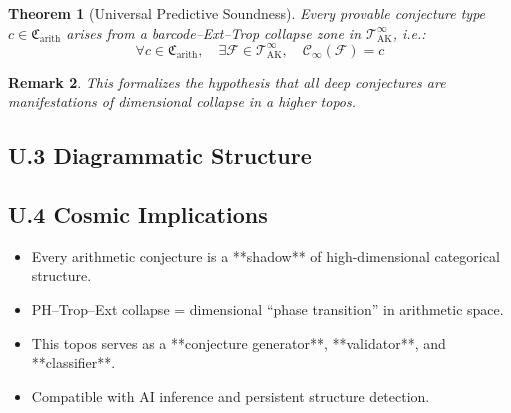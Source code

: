\documentclass[11pt]{article}
\newtheorem{theorem}{Theorem}[section]
\newtheorem{remark}[theorem]{Remark}
\begin{document}
\begin{theorem}[Universal Predictive Soundness]
Every provable conjecture type \( c \in \mathfrak{C}_{\mathrm{arith}} \) arises from a barcode–Ext–Trop collapse zone in \( \mathscr{T}_{\mathrm{AK}}^{\infty} \),  
i.e.:
\[
\forall c \in \mathfrak{C}_{\mathrm{arith}}, \quad \exists \mathcal{F} \in \mathscr{T}_{\mathrm{AK}}^{\infty}, \quad
\mathscr{C}_\infty(\mathcal{F}) = c
\]
\end{theorem}

\begin{remark}
This formalizes the hypothesis that all deep conjectures are manifestations of dimensional collapse in a higher topos.
\end{remark}

\subsection*{U.3 Diagrammatic Structure}

\vspace{1em}
\begin{center}
\end{center}
\vspace{1em}

\subsection*{U.4 Cosmic Implications}

\begin{itemize}
  \item Every arithmetic conjecture is a **shadow** of high-dimensional categorical structure.
  \item PH–Trop–Ext collapse = dimensional “phase transition” in arithmetic space.
  \item This topos serves as a **conjecture generator**, **validator**, and **classifier**.
  \item Compatible with AI inference and persistent structure detection.
\end{itemize}
\end{document}
